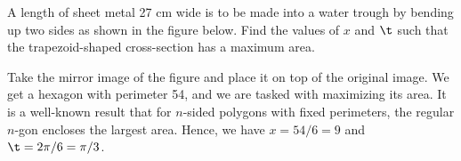 \begin{problem}
    A length of sheet metal 27 cm wide is to be made into a water trough by bending up two sides as shown in the figure below. Find the values of $x$ and $\t$ such that the trapezoid-shaped cross-section has a maximum area.

    \begin{center}
    \end{center}
\end{problem}
\begin{solution}[1]
    Take the mirror image of the figure and place it on top of the original image. We get a hexagon with perimeter 54, and we are tasked with maximizing its area. It is a well-known result that for $n$-sided polygons with fixed perimeters, the regular $n$-gon encloses the largest area. Hence, we have $x = 54/6 = 9$ and $\t = 2\pi/6 = \pi/3$.
\end{solution}
